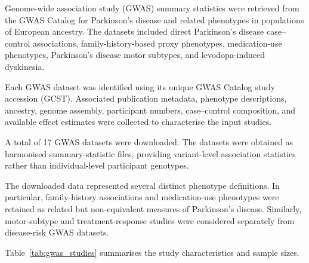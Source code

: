 \documentclass[11pt,a4paper]{article}
\begin{document}
Genome-wide association study (GWAS) summary statistics
were retrieved from the GWAS Catalog for Parkinson's
disease and related phenotypes in populations of
European ancestry. The datasets included direct
Parkinson's disease case--control associations,
family-history-based proxy phenotypes, medication-use
phenotypes, Parkinson's disease motor subtypes, and
levodopa-induced dyskinesia.

Each GWAS dataset was identified using its unique GWAS
Catalog study accession (GCST). Associated publication
metadata, phenotype descriptions, ancestry, genome
assembly, participant numbers, case--control composition,
and available effect estimates were collected to
characterise the input studies.

A total of 17 GWAS datasets were downloaded. The datasets
were obtained as harmonised summary-statistic files,
providing variant-level association statistics rather
than individual-level participant genotypes.

The downloaded data represented several distinct
phenotype definitions. In particular, family-history
associations and medication-use phenotypes were retained
as related but non-equivalent measures of Parkinson's
disease. Similarly, motor-subtype and treatment-response
studies were considered separately from disease-risk
GWAS datasets.

Table~\ref{tab:gwas_studies} summarises the study
characteristics and sample sizes.

\begingroup
\scriptsize
\setlength{\tabcolsep}{3pt}
\end{document}
